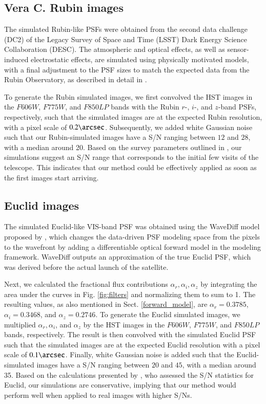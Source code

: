 \documentclass[traditabstract]{aa}
\begin{document}
\subsection{Vera C. Rubin images}
\label{sec:lsst_gen}

The simulated Rubin-like PSFs were obtained from the second data challenge (DC2) of the Legacy Survey of Space and Time (LSST) Dark Energy Science Collaboration (DESC). The atmospheric and optical effects, as well as sensor-induced electrostatic effects, are simulated using physically motivated models, with a final adjustment to the PSF sizes to match the expected data from the Rubin Observatory, as described in detail in \cite{lsst_2021}.

To generate the Rubin simulated images, we first convolved the HST images in the $F606W$, $F775W$, and $F850LP$ bands with the Rubin $r$-, $i$-, and $z$-band PSFs, respectively, such that the simulated images are at the expected Rubin resolution, with a pixel scale of $0.2\arcsec$. Subsequently, we added white Gaussian noise such that our Rubin-simulated images have a S/N ranging between $12$ and $28$, with a median around 20. Based on the survey parameters outlined in \cite{lsst_2019}, our simulations suggest an S/N range that corresponds to the initial few visits of the telescope. This indicates that our method could be effectively applied as soon as the first images start arriving. 


\subsection{Euclid images}
\label{sec:euclid_gen}

The simulated Euclid-like VIS-band PSF was obtained using the WaveDiff model proposed by \cite{tobias2022}, which changes the data-driven PSF modeling
space from the pixels to the wavefront by adding a differentiable optical forward model in the modeling framework. WaveDiff outputs an approximation of the true Euclid PSF, which was derived before the actual launch of the satellite. 

Next, we calculated the fractional flux contributions $\alpha_r, \alpha_i, \alpha_z$ by integrating the area under the curves in Fig. \ref{fig:filters} and normalizing them to sum to 1. The resulting values, as also mentioned in Sect. \ref{forward_model}, are $\alpha_r=0.3785$, $\alpha_i=0.3468$, and $\alpha_z=0.2746$. To generate the Euclid simulated images, we multiplied $\alpha_r, \alpha_i$, and  $\alpha_z$ by the HST images in the $F606W$, $F775W$, and $F850LP$ bands, respectively. The result is then convolved with the simulated Euclid PSF such that the simulated images are at the expected Euclid resolution with a pixel scale of $0.1\arcsec$. Finally, white Gaussian noise is added such that the Euclid-simulated images have a S/N ranging between $20$ and $45$, with a median around 35. Based on the calculations presented by \cite{Euclid2}, who assessed the S/N statistics for Euclid, our simulations are conservative, implying that our method would perform well when applied to real images with higher S/Ns. 
\end{document}
